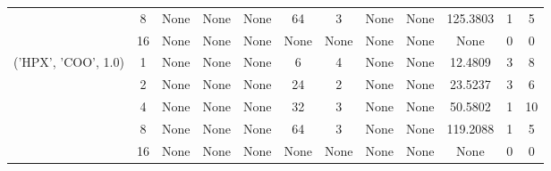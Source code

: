 \begin{tabular}{cccccccccccc}
& 8& None& None& None& 64& 3& None& None& 125.3803& 1& 5\\
& 16& None& None& None& None& None& None& None& None& 0& 0\\
\hline
\multirow{5}{*}{('HPX', 'COO', 1.0)}& 1& None& None& None& 6& 4& None& None& 12.4809& 3& 8\\
& 2& None& None& None& 24& 2& None& None& 23.5237& 3& 6\\
& 4& None& None& None& 32& 3& None& None& 50.5802& 1& 10\\
& 8& None& None& None& 64& 3& None& None& 119.2088& 1& 5\\
& 16& None& None& None& None& None& None& None& None& 0& 0\\
\hline
\end{tabular}
